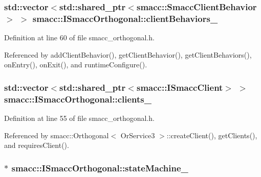 \subsubsection[{\texorpdfstring{client\+Behaviors\+\_\+}{clientBehaviors_}}]{\setlength{\rightskip}{0pt plus 5cm}std\+::vector$<$std\+::shared\+\_\+ptr$<${\bf smacc\+::\+Smacc\+Client\+Behavior}$>$ $>$ smacc\+::\+I\+Smacc\+Orthogonal\+::client\+Behaviors\+\_\+\hspace{0.3cm}{\ttfamily [private]}}\hypertarget{classsmacc_1_1ISmaccOrthogonal_ad9e6c0f9055e51a61c9728ac7117dae2}{}\label{classsmacc_1_1ISmaccOrthogonal_ad9e6c0f9055e51a61c9728ac7117dae2}


Definition at line 60 of file smacc\+\_\+orthogonal.\+h.



Referenced by add\+Client\+Behavior(), get\+Client\+Behavior(), get\+Client\+Behaviors(), on\+Entry(), on\+Exit(), and runtime\+Configure().

\subsubsection[{\texorpdfstring{clients\+\_\+}{clients_}}]{\setlength{\rightskip}{0pt plus 5cm}std\+::vector$<$std\+::shared\+\_\+ptr$<${\bf smacc\+::\+I\+Smacc\+Client}$>$ $>$ smacc\+::\+I\+Smacc\+Orthogonal\+::clients\+\_\+\hspace{0.3cm}{\ttfamily [protected]}}\hypertarget{classsmacc_1_1ISmaccOrthogonal_a0f270e9c8c126198f6bce542ab4e04ba}{}\label{classsmacc_1_1ISmaccOrthogonal_a0f270e9c8c126198f6bce542ab4e04ba}


Definition at line 55 of file smacc\+\_\+orthogonal.\+h.



Referenced by smacc\+::\+Orthogonal$<$ Or\+Service3 $>$\+::create\+Client(), get\+Clients(), and requires\+Client().

\subsubsection[{\texorpdfstring{state\+Machine\+\_\+}{stateMachine_}}]{$\ast$ smacc\+::\+I\+Smacc\+Orthogonal\+::state\+Machine\+\_\+\hspace{0.3cm}{\ttfamily [private]}}\hypertarget{classsmacc_1_1ISmaccOrthogonal_a418b2e094a65013444ec1fca7e94f28d}{}\label{classsmacc_1_1ISmaccOrthogonal_a418b2e094a65013444ec1fca7e94f28d}



